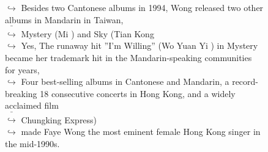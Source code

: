 \documentclass[11pt,a4paper, onecolumn]{article}
\begin{document}
\begin{figure}[t] \small \begin{tcolorbox}[boxsep=0pt,left=5pt,right=0pt,top=2pt,colback = yellow!5] \begin{dialogue}
 \small 
\colorbox{pink!25}{$\hookrightarrow$}
{ Besides two Cantonese albums in 1994, Wong released two other albums in Mandarin in Taiwan, }
\\
\colorbox{pink!25}{ $\bar{\hookrightarrow}$}
{ Mystery (Mi ) and Sky (Tian Kong }
\\
\colorbox{pink!25}{$\hookrightarrow$}
\colorbox{red!25}{Yes,}
{ The runaway hit ''I'm Willing'' (Wo Yuan Yi ) in Mystery became her trademark hit in the Mandarin-speaking communities for years, }
\\
\colorbox{pink!25}{$\hookrightarrow$}
{ Four best-selling albums in Cantonese and Mandarin, a record-breaking 18 consecutive concerts in Hong Kong, and a widely acclaimed film }
\\
\colorbox{pink!25}{ $\bar{\hookrightarrow}$}
{ Chungking Express) }
\\
\colorbox{pink!25}{$\hookrightarrow$}
{ made Faye Wong the most eminent female Hong Kong singer in the mid-1990s. }
\\
 \end{dialogue}\end{tcolorbox}\end{figure}
\end{document}
